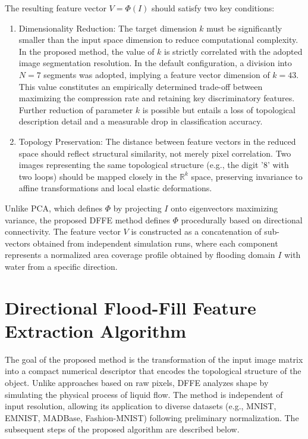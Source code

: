 \documentclass[a4paper,fleqn]{cas-dc}
\begin{document}
The resulting feature vector $V = \Phi(I)$ should satisfy two key conditions:
\begin{enumerate}
    \item Dimensionality Reduction: The target dimension $k$ must be significantly smaller than the input space dimension to reduce computational complexity. In the proposed method, the value of $k$ is strictly correlated with the adopted image segmentation resolution. In the default configuration, a division into $N=7$ segments was adopted, implying a feature vector dimension of $k=43$. This value constitutes an empirically determined trade-off between maximizing the compression rate and retaining key discriminatory features. Further reduction of parameter $k$ is possible but entails a loss of topological description detail and a measurable drop in classification accuracy.
    \item Topology Preservation: The distance between feature vectors in the reduced space should reflect structural similarity, not merely pixel correlation. Two images representing the same topological structure (e.g., the digit '8' with two loops) should be mapped closely in the $\mathbb{R}^k$ space, preserving invariance to affine transformations and local elastic deformations.
\end{enumerate}
Unlike PCA, which defines $\Phi$ by projecting $I$ onto eigenvectors maximizing variance, the proposed DFFE method defines $\Phi$ procedurally based on directional connectivity. The feature vector $V$ is constructed as a concatenation of sub-vectors obtained from independent simulation runs, where each component represents a normalized area coverage profile obtained by flooding domain $I$ with water from a specific direction.



\section{Directional Flood-Fill Feature Extraction Algorithm}\label{sec-proposed-method}

The goal of the proposed method is the transformation of the input image matrix into a compact numerical descriptor that encodes the topological structure of the object. Unlike approaches based on raw pixels, DFFE analyzes shape by simulating the physical process of liquid flow. The method is independent of input resolution, allowing its application to diverse datasets (e.g., MNIST, EMNIST, MADBase, Fashion-MNIST) following preliminary normalization. The subsequent steps of the proposed algorithm are described below.
\end{document}
